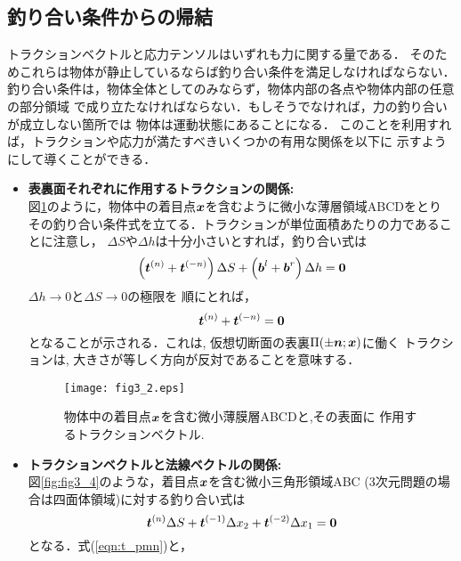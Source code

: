 \documentclass[10pt,a4j]{jbook}
\begin{document}
\subsection{釣り合い条件からの帰結}\label{equib}
トラクションベクトルと応力テンソルはいずれも力に関する量である．
そのためこれらは物体が静止しているならば釣り合い条件を満足しなければならない．
釣り合い条件は，物体全体としてのみならず，物体内部の各点や物体内部の任意の部分領域
で成り立たなければならない．もしそうでなければ，力の釣り合いが成立しない箇所では
物体は運動状態にあることになる．
このことを利用すれば，トラクションや応力が満たすべきいくつかの有用な関係を以下に
示すようにして導くことができる．
\begin{itemize}
\item
	{\bf 表裏面それぞれに作用するトラクションの関係:}\\
	図\ref{fig:fig3_2}のように，物体中の着目点$\mbox{\boldmath $x$}$を含むように微小な薄層領域ABCDをとり
	その釣り合い条件式を立てる．トラクションが単位面積あたりの力であることに注意し，
	$\Delta S$や$\Delta h$は十分小さいとすれば，釣り合い式は
	\begin{equation}
		\left(\mbox{\boldmath $t$}^{(n)}+\mbox{\boldmath $t$}^{(-n)}\right)\Delta S 
		+
		\left(\mbox{\boldmath $b$}^{l}+\mbox{\boldmath $b$}^{r}\right)\Delta h 
		=\mbox{\boldmath $0$}
	\end{equation}
		$\Delta h \rightarrow 0$と$\Delta S\rightarrow 0$の極限を
	順にとれば，
	\begin{equation}
		\mbox{\boldmath $t$}^{(n)}+\mbox{\boldmath $t$}^{(-n)}=\mbox{\boldmath $0$}
		\label{eqn:t_pmn}
	\end{equation}
	となることが示される．これは, 仮想切断面の表裏$\Pi(\pm \mbox{\boldmath $n$};\mbox{\boldmath $x$})$に働く
	トラクションは, 大きさが等しく方向が反対であることを意味する．
	\begin{figure}[h]
	\begin{center}
	\texttt{[image: fig3\_2.eps]} 
	\end{center}
	\caption{物体中の着目点$\mbox{\boldmath $x$}$を含む微小薄膜層ABCDと,その表面に
	作用するトラクションベクトル. } 
	\label{fig:fig3_2}
	\end{figure}
\item
	{\bf トラクションベクトルと法線ベクトルの関係:}\\
	図\ref{fig:fig3_4}のような，着目点$\mbox{\boldmath $x$}$を含む微小三角形領域ABC
	(3次元問題の場合は四面体領域)に対する釣り合い式は
	\begin{equation}
		\mbox{\boldmath $t$}^{(n)}\Delta S +\mbox{\boldmath $t$}^{(-1)}\Delta x_2 + \mbox{\boldmath $t$}^{(-2)}\Delta x_1 =\mbox{\boldmath $0$}
		\label{eqn:equib_tri}
	\end{equation}
	となる．式(\ref{eqn:t_pmn})と，

\end{itemize}
\end{document}
